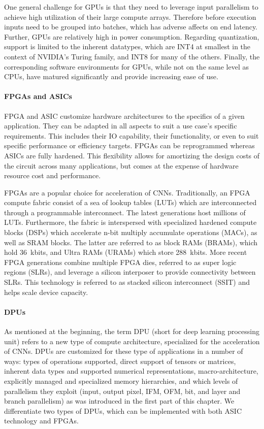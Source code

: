 One general challenge for GPUs is that they need to leverage input parallelism to achieve high utilization of their large compute arrays. Therefore before execution inputs need to be grouped into batches, which has adverse affects on end latency. 
Further, GPUs are relatively high in power consumption.
Regarding quantization, support is limited to the inherent datatypes, which are INT4 at smallest in the context of NVIDIA's Turing family, and INT8 for many of the others.
Finally, the corresponding software environments for GPUs, while not on the same level as CPUs, have matured significantly and provide increasing ease of use.

\paragraph*{FPGAs and ASICs}
FPGA and ASIC customize hardware architectures to the specifics of a given application.
They can be adapted in all aspects to suit a use case's specific requirements.
This includes their IO capability, their functionality, or even to suit specific performance or efficiency targets. 
FPGAs can be reprogrammed whereas ASICs are fully hardened.
This flexibility allows for amortizing the design costs of the circuit across many applications, but comes at the expense of hardware resource cost and performance.

FPGAs are a popular choice for acceleration of CNNs. 
Traditionally, an FPGA compute fabric consist of a sea of lookup tables (LUTs) which are interconnected through a programmable interconnect. The latest generations host millions of LUTs. Furthermore, the fabric is interspersed with specialized hardened compute blocks (DSPs) which accelerate n-bit multiply accumulate operations (MACs), as well as SRAM blocks. The latter are referred to as block RAMs (BRAMs), which hold 36~kbits, and Ultra RAMs (URAMs) which store 288~kbits.
More recent FPGA generations combine multiple FPGA dies, referred to as super logic regions (SLRs), and leverage a silicon interposer to provide connectivity between SLRs. 
This technology is referred to as stacked silicon interconnect (SSIT) and helps scale device capacity.

\paragraph*{DPUs} As mentioned at the beginning, the term DPU (short for deep learning processing unit) refers to a new type of compute architecture, specialized for the acceleration of CNNs. 
DPUs are customized for these type of applications in a number of ways: types of operations supported, direct support of tensors or matrices, inherent data types and supported numerical representations, macro-architecture, explicitly managed and specialized memory hierarchies, and which levels of parallelism they exploit (input, output pixel, IFM, OFM, bit, and layer and branch parallelism) as was introduced in the first part of this chapter.
We differentiate two types of DPUs, which can be implemented with both ASIC technology and FPGAs.

